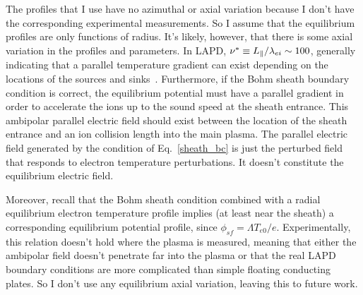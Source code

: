 The profiles that I use have no azimuthal or axial variation because I don't have the corresponding experimental measurements. So I assume that the equilibrium profiles are only functions
of radius. It's likely, however, that there is some axial variation in the profiles and parameters. In LAPD, $\nu^* \equiv L_\parallel/\lambda_{ei} \sim 100$, generally indicating that a
parallel temperature gradient can exist depending on the locations of the sources and sinks~\cite{stangeby2000}. 
Furthermore, if the Bohm sheath boundary condition is correct, the equilibrium potential must have a parallel gradient in order
to accelerate the ions up to the sound speed at the sheath entrance. This ambipolar parallel electric field should exist between the location of the sheath entrance and an ion collision length
into the main plasma. The parallel electric field generated by the condition of Eq.~\ref{sheath_bc} is just the perturbed field that responds to electron temperature perturbations. It doesn't
constitute the equilibrium electric field. 

Moreover, recall that the Bohm sheath condition combined with a radial equilibrium electron temperature profile implies (at least near the sheath) a corresponding equilibrium potential profile, since 
$\phi_{sf} = \Lambda T_{e0} / e$. Experimentally, this relation doesn't hold where the plasma is measured, meaning that either the ambipolar field doesn't penetrate far into the plasma or that
the real LAPD boundary conditions are more complicated than simple floating conducting plates. So I don't use any equilibrium axial variation, leaving this to future work.



